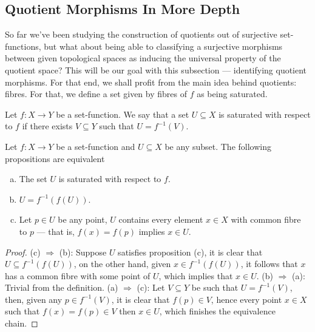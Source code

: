 \subsection{Quotient Morphisms In More Depth}

So far we've been studying the construction of quotients out of surjective
set-functions, but what about being able to classifying a surjective morphisms
between given topological spaces as inducing the universal property of the
quotient space? This will be our goal with this subsection --- identifying
quotient morphisms. For that end, we shall profit from the main idea behind
quotients: fibres. For that, we define a set given by fibres of \(f\) as being
saturated.

\begin{definition}
\label{def:saturated-fibre}
Let \(f: X \to Y\) be a set-function. We say that a set \(U \subseteq X\) is
saturated with respect to \(f\) if there exists \(V \subseteq Y\) such that
\(U = f^{-1}(V)\).
\end{definition}

\begin{proposition}
\label{prop:equivalences-saturated-fibre}
Let \(f: X \to Y\) be a set-function and \(U \subseteq X\) be any subset. The
following propositions are equivalent
\begin{enumerate}[(a)]\setlength\itemsep{0em}
\item The set \(U\) is saturated with respect to \(f\).
\item \(U = f^{-1}(f(U))\).
\item Let \(p \in U\) be any point, \(U\) contains every element \(x \in X\)
  with common fibre to \(p\) --- that is, \(f(x) = f(p)\) implies \(x \in U\).
\end{enumerate}
\end{proposition}

\begin{proof}
(c) \(\Rightarrow\) (b): Suppose \(U\) satisfies proposition (c), it is clear
that \(U \subseteq f^{-1}(f(U))\), on the other hand, given \(x \in
f^{-1}(f(U))\), it follows that \(x\) has a common fibre with some point of
\(U\), which implies that \(x \in U\). (b) \(\Rightarrow\) (a): Trivial from the
definition. (a) \(\Rightarrow\) (c): Let \(V \subseteq Y\) be such that \(U =
f^{-1}(V)\), then, given any \(p \in f^{-1}(V)\), it is clear that \(f(p) \in
V\), hence every point \(x \in X\) such that \(f(x) = f(p) \in V\) then \(x \in
U\), which finishes the equivalence chain.
\end{proof}

